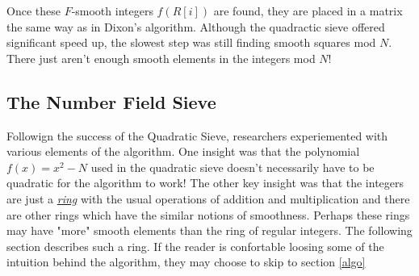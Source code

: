   Once these $F$-smooth integers $f(R[i])$ are found, they are placed in a matrix the same way as in Dixon's algorithm. Although the quadractic sieve offered significant speed up, the slowest step was still finding smooth squares mod $N$. There just aren't enough smooth elements in the integers mod $N$!     
   
\subsection{The Number Field Sieve} 
  Followign the success of the Quadratic Sieve, researchers experiemented with various elements of the algorithm. One insight was that the polynomial $f(x) = x^2 - N $ used in the quadratic sieve doesn't necessarily have to be quadratic for the algorithm to work! The other key insight was that the integers are just a \hyperref[ring]{\textit{ring}} with the usual operations of addition and multiplication and there are other rings which have the similar notions of smoothness. Perhaps these rings may have "more" smooth elements than the ring of regular integers. The following section describes such a ring. If the reader is confortable loosing some of the intuition behind the algorithm, they may choose to skip to section \ref{algo}

